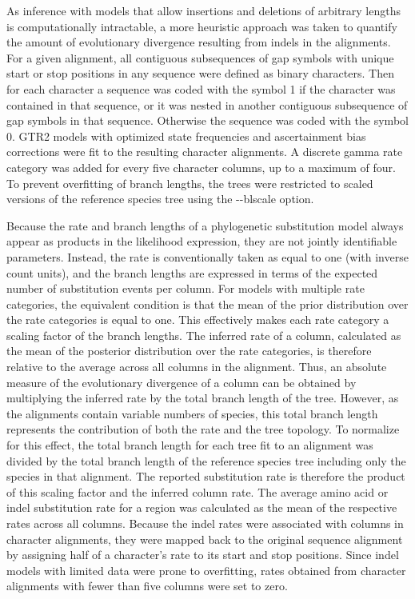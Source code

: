 As inference with models that allow insertions and deletions of arbitrary lengths is computationally intractable, a more heuristic approach was taken to quantify the amount of evolutionary divergence resulting from indels in the alignments. For a given alignment, all contiguous subsequences of gap symbols with unique start or stop positions in any sequence were defined as binary characters. Then for each character a sequence was coded with the symbol 1 if the character was contained in that sequence, or it was nested in another contiguous subsequence of gap symbols in that sequence. Otherwise the sequence was coded with the symbol 0. GTR2 models with optimized state frequencies and ascertainment bias corrections were fit to the resulting character alignments. A discrete gamma rate category was added for every five character columns, up to a maximum of four. To prevent overfitting of branch lengths, the trees were restricted to scaled versions of the reference species tree using the -{}-blscale option.

Because the rate and branch lengths of a phylogenetic substitution model always appear as products in the likelihood expression, they are not jointly identifiable parameters. Instead, the rate is conventionally taken as equal to one (with inverse count units), and the branch lengths are expressed in terms of the expected number of substitution events per column. For models with multiple rate categories, the equivalent condition is that the mean of the prior distribution over the rate categories is equal to one. This effectively makes each rate category a scaling factor of the branch lengths. The inferred rate of a column, calculated as the mean of the posterior distribution over the rate categories, is therefore relative to the average across all columns in the alignment. Thus, an absolute measure of the evolutionary divergence of a column can be obtained by multiplying the inferred rate by the total branch length of the tree. However, as the alignments contain variable numbers of species, this total branch length represents the contribution of both the rate and the tree topology. To normalize for this effect, the total branch length for each tree fit to an alignment was divided by the total branch length of the reference species tree including only the species in that alignment. The reported substitution rate is therefore the product of this scaling factor and the inferred column rate. The average amino acid or indel substitution rate for a region was calculated as the mean of the respective rates across all columns. Because the indel rates were associated with columns in character alignments, they were mapped back to the original sequence alignment by assigning half of a character's rate to its start and stop positions. Since indel models with limited data were prone to overfitting, rates obtained from character alignments with fewer than five columns were set to zero.

